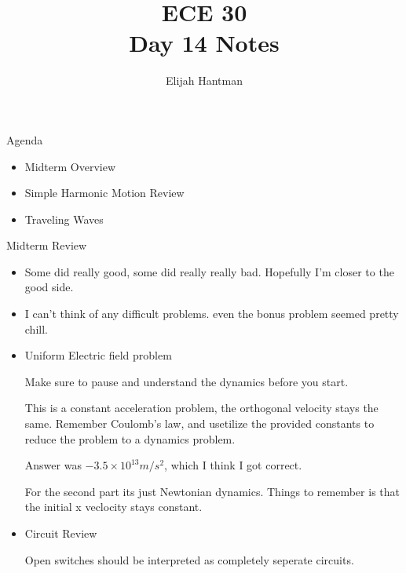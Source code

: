 \documentclass{report}
\title{\Huge{ECE 30}\\Day 14 Notes}
\author{\huge{Elijah Hantman}}
\date{}
\begin{document}
\maketitle
\newpage

\begin{description}
    \item {\large Agenda} 
        \begin{mdframed}
            \begin{itemize}
                \item Midterm Overview
                \item Simple Harmonic Motion Review
                \item Traveling Waves
            \end{itemize}
        \end{mdframed}
    \item {\large Midterm Review}
        \begin{mdframed}
            \begin{itemize}
                \item Some did really good, some did really really
                    bad. Hopefully I'm closer to the good side.
                \item I can't think of any difficult problems. even
                    the bonus problem seemed pretty chill.
                \item Uniform Electric field problem
                    \begin{mdframed}
                        Make sure to pause and understand the dynamics
                        before you start.

                        This is a constant acceleration problem,
                        the orthogonal velocity stays the same.
                        Remember Coulomb's law, and usetilize the
                        provided constants to reduce the problem
                        to a dynamics problem.

                        Answer was $-3.5 \times 10^{13} \si{m/s^2}$, which I think I got correct.
                    \end{mdframed}
                    \begin{mdframed}
                        For the second part its just Newtonian dynamics.
                        Things to remember is that the initial x veclocity
                        stays constant.
                    \end{mdframed}
                \item Circuit Review
                    \begin{mdframed}
                        Open switches should be interpreted as completely
                        seperate circuits. 


\end{mdframed}
\end{itemize}
\end{mdframed}
\end{description}
\end{document}
